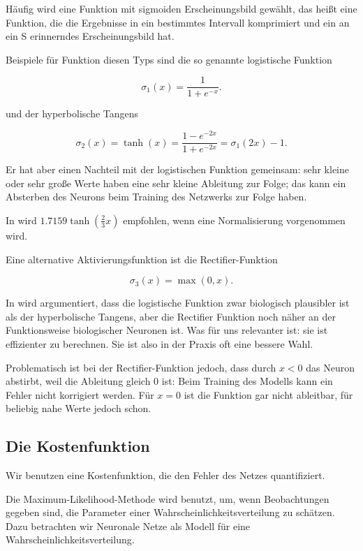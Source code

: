 Häufig wird eine Funktion mit sigmoiden Erscheinungsbild gewählt, das heißt eine Funktion, die die Ergebnisse in ein bestimmtes Intervall komprimiert und ein an ein S erinnerndes Erscheinungsbild hat. 

Beispiele für Funktion diesen Typs sind die so genannte logistische Funktion

\begin{equation}
\sigma_1(x) = \frac{1}{1+e^{-x}}.
\end{equation}

und der hyperbolische Tangens

\begin{equation}
\sigma_2(x) = \tanh(x) = \frac{1-e^{-2x}}{1+e^{-2x}} = 
\sigma_1(2x) -1.
\end{equation}

Er hat aber einen Nachteil mit der logistischen Funktion gemeinsam: sehr kleine oder sehr große Werte haben eine sehr kleine Ableitung zur Folge; das kann ein Absterben des Neurons beim Training des Netzwerks zur Folge haben. 

In \cite{lecunefficient} wird $1.7159 \tanh(\frac{2}{3} x)$ empfohlen, wenn eine Normalisierung vorgenommen wird. 

Eine alternative Aktivierungsfunktion ist die Rectifier-Funktion 

\begin{equation}
\sigma_3(x) = \max(0,x).
\end{equation} 

In \cite{glorot2011deep} wird argumentiert, dass die logistische Funktion zwar biologisch plausibler ist als der hyperbolische Tangens, aber die Rectifier Funktion noch näher an der Funktionsweise biologischer Neuronen ist. Was für uns relevanter ist: sie ist effizienter zu berechnen. Sie ist also in der Praxis oft eine bessere Wahl. 

Problematisch ist bei der Rectifier-Funktion jedoch, dass durch $x < 0$ das Neuron abstirbt, weil die Ableitung gleich 0 ist: Beim Training des Modells kann ein Fehler nicht korrigiert werden. Für $x = 0$ ist die Funktion gar nicht ableitbar, für beliebig nahe Werte jedoch schon\cite{bengio2012practical}. 

\subsection{Die Kostenfunktion}
Wir benutzen eine Kostenfunktion, die den Fehler des Netzes quantifiziert.

Die Maximum-Likelihood-Methode wird benutzt, um, wenn Beobachtungen gegeben sind, die Parameter einer Wahrscheinlichkeitsverteilung zu schätzen. Dazu betrachten wir Neuronale Netze als Modell für eine Wahrscheinlichkeitsverteilung.

